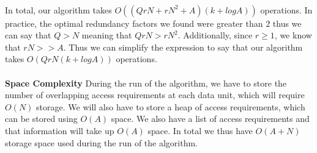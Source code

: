 \\
In total, our algorithm takes $O((QrN + rN^2 + A)(k + logA))$ operations. In practice, the optimal redundancy factors we found were greater than $2$ thus we can say that $Q > N$ meaning that $QrN > rN^2$. Additionally, since $r \geq 1$, we know that $rN > > A$. Thus we can simplify the expression to say that our algorithm takes $O(QrN(k + logA))$ operations. \\
\\
{\bf Space Complexity} During the run of the algorithm, we have to store the number of overlapping access requirements at each data unit, which will require $O(N)$ storage. We will also have to store a heap of access requirements, which can be stored using $O(A)$ space. We also have a list of access requirements and that information will take up $O(A)$ space. In total we thus have $O(A + N)$ storage space used during the run of the algorithm. 